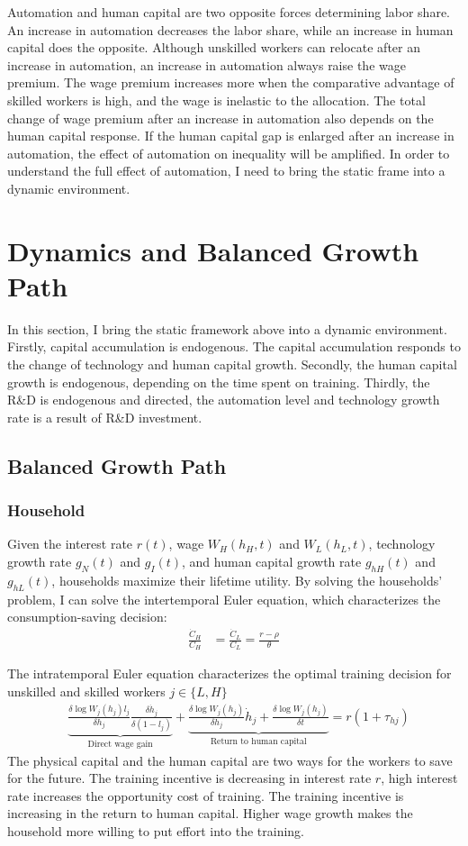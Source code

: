 \documentclass[12pt]{article}
\begin{document}
Automation and human capital are two opposite forces determining labor share. An increase in automation decreases the labor share, while an increase in human capital does the opposite. Although unskilled workers can relocate after an increase in automation, an increase in automation always raise the wage premium. The wage premium increases more when the comparative advantage of skilled workers is high, and the wage is inelastic to the allocation. The total change of wage premium after an increase in automation also depends on the human capital response. If the human capital gap is enlarged after an increase in automation, the effect of automation on inequality will be amplified. In order to understand the full effect of automation, I need to bring the static frame into a dynamic environment. 


\section{Dynamics and Balanced Growth Path}
In this section, I bring the static framework above into a dynamic environment. Firstly, capital accumulation is endogenous. The capital accumulation responds to the change of technology and human capital growth. Secondly, the human capital growth is endogenous, depending on the time spent on training. Thirdly, the R\&D is endogenous and directed, the automation level and technology growth rate is a result of R\&D investment.

\subsection{Balanced Growth Path}
\subsubsection*{Household}
Given the interest rate $r(t)$, wage $W_H(h_H,t)$ and $W_L(h_L,t)$, technology growth rate $g_N(t)$ and $g_I(t)$, and human capital growth rate $g_{hH}(t)$ and  $g_{hL}(t)$, households maximize their lifetime utility. By solving the households' problem, I can solve the intertemporal Euler equation, which characterizes the consumption-saving decision: 
\begin{align}
\frac{\dot{C}_H}{C_H} &= \frac{\dot{C}_L}{C_L}  = \frac{r-\rho}{\theta} 
\end{align}

The intratemporal Euler equation characterizes the optimal training decision for unskilled and skilled workers $j\in\{L,H\}$
\begin{align}
&\underbrace{\frac{\delta \log W_j(h_j)l_j}{\delta h_j}\frac{\delta \dot{h}_j}{\delta (1-l_j)}}_{\text{Direct wage gain}}+\underbrace{\frac{\delta \log W_j(h_j)}{\delta h_j}\dot{h}_j+\frac{\delta \log W_j(h_j)}{\delta t}}_{\text{Return to human capital}}= r(1+\tau_{hj})
\end{align}
The physical capital and the human capital are two ways for the workers to save for the future. The training incentive is decreasing in interest rate $r$, high interest rate increases the opportunity cost of training. The training incentive is increasing in the return to human capital. Higher wage growth makes the household more willing to put effort into the training.
\end{document}
